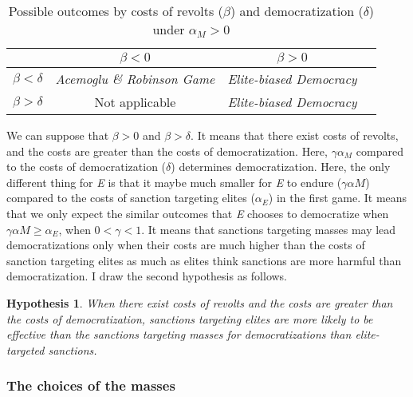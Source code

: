 \documentclass[11pt, letterpage]{article}
\newtheorem{hyp}{Hypothesis}
\begin{document}
\begin{table}[!ht]
	\centering
	\begin{tabular}{l*{3}{c}}
		\toprule
		&\multicolumn{1}{c}{$\beta < 0$}		&\multicolumn{1}{c}{$\beta > 0$} \\
		\midrule
		$\beta < \delta$	   & \textit{Acemoglu \& Robinson Game} & \textit{Elite-biased Democracy}\\
		$\beta > \delta$	   & Not applicable					 	& \textit{Elite-biased Democracy}\\
		\bottomrule
	\end{tabular}
	\caption{Possible outcomes by costs of revolts ($\beta$) and democratization ($\delta$) under $\alpha_{M} > 0$}
	\label{tab:table2}
\end{table}


We can suppose that $\beta > 0$ and $\beta > \delta$. It means that there exist costs of revolts, and the costs are greater than the costs of democratization. Here, $\gamma\alpha_{M}$ compared to the costs of democratization ($\delta$) determines democratization. Here, the only different thing for \textit{E} is that it maybe much smaller for \textit{E} to endure ($\gamma\alpha{M}$) compared to the costs of sanction targeting elites ($\alpha_{E}$) in the first game. It means that we only expect the similar outcomes that \textit{E} chooses to democratize when $\gamma\alpha{M} \geq \alpha_{E}$, when $0 < \gamma < 1$. It means that sanctions targeting masses may  lead democratizations only when their costs are much higher than the costs of sanction targeting elites as much as elites think sanctions are more harmful than democratization. I draw the second hypothesis as follows.



\begin{hyp}
\label{hyp2}
	When there exist costs of revolts and the costs are greater than the costs of democratization, sanctions targeting elites are more likely to be effective than the sanctions targeting masses for democratizations than elite-targeted sanctions.
\end{hyp}

	

\subsubsection*{The choices of the masses}
\end{document}
